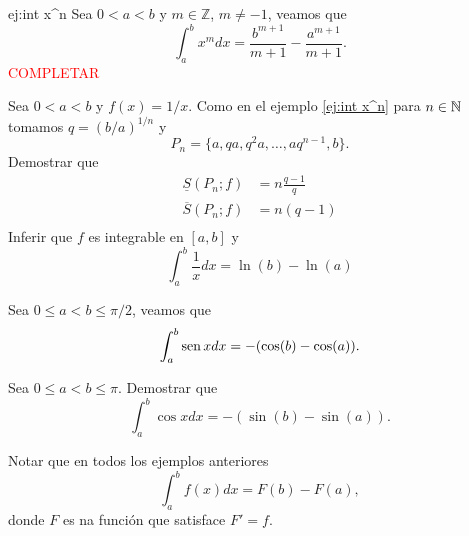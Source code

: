 \begin{ejemplo}{ej:int x^n} Sea $0< a<b$ y $m\in\mathbb{Z}$, $m\neq -1$,  veamos que 
\[
 \int_a^b x^m dx=\frac{b^{m+1}}{m+1}-\frac{a^{m+1}}{m+1}.
\]
\textcolor{red}{COMPLETAR}
\end{ejemplo}

\begin{ejercicio}{} Sea $0< a<b$  y $f(x)=1/x$. Como en el ejemplo \ref{ej:int x^n}  para $n\in\mathbb{N}$ tomamos $q=(b/a)^{1/n}$ y 
\[P_n=\{a,qa,q^2a,\ldots, aq^{n-1},b\}.\]  
Demostrar que
\[
\begin{split}
  \underline{S}(P_n;f)&= n\frac{q-1}{q}\\
  \overline{S}(P_n;f)&= n(q-1)\\
\end{split}
\]
Inferir que $f$ es integrable en $[a,b]$ y
\[
 \int_a^b \frac{1}{x} dx= \ln(b)-\ln(a)
\]
\end{ejercicio}


\begin{ejemplo}{} Sea $0\leq a<b\leq \pi/2$, veamos que
\[
 \int_a^b \operatorname{sen} x dx=-(\cos(b)-\cos(a)).
\]
\end{ejemplo}



\begin{ejercicio}{} Sea $0\leq a<b\leq \pi$. Demostrar que
\[
 \int_a^b \cos x dx=-(\sin(b)-\sin(a)).
\]
\end{ejercicio}


\begin{observa} Notar que en todos los ejemplos anteriores
\[
 \int_a^bf(x)dx=F(b)-F(a),
\]
donde $F$ es na función que satisface $F'=f$.
\end{observa}

% 
% 
% 
% 
% 
% 
%  




